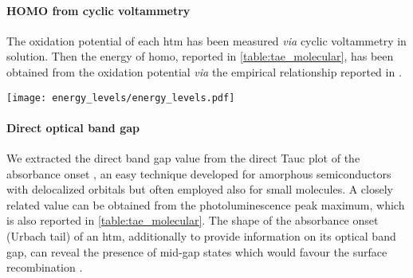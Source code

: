 \paragraph{HOMO from cyclic voltammetry}
The oxidation potential of each \gls{htm} has been measured \textsl{via} cyclic voltammetry in solution.
Then the energy of \gls{homo}, reported in \cref{table:tae_molecular}, has been obtained from the oxidation potential \textsl{via} the empirical relationship reported in .

\begin{SCfigure}
	\centering
	\texttt{[image: energy\_levels/energy\_levels.pdf]}
	\label{fig:tae-energy_levels}
\end{SCfigure}

\paragraph{Direct optical band gap}
We extracted the direct band gap value from the direct Tauc plot of the absorbance onset \cite{WikipediaTauc}, an easy technique developed for amorphous semiconductors \cite{Stenzel2005} with delocalized orbitals but often employed also for small molecules.
A closely related value can be obtained from the photoluminescence peak maximum, which is also reported in \cref{table:tae_molecular}.
The shape of the absorbance onset (Urbach tail) of an \gls{htm}, additionally to provide information on its optical band gap, can reveal the presence of mid-gap states which would favour the surface recombination \cite{Tvingstedt2017}.

